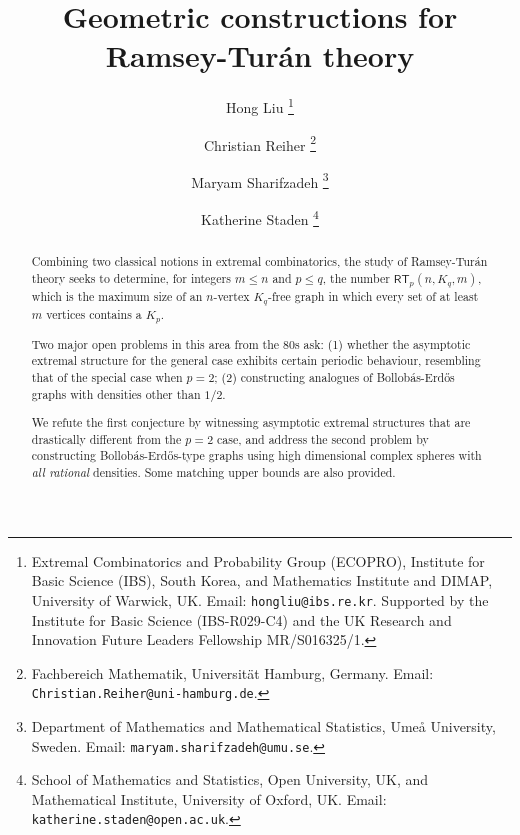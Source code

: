 \documentclass[11pt, a4paper]{article}
\title{Geometric constructions for Ramsey-Tur\'an theory}
\author{
	Hong Liu
	\thanks{Extremal Combinatorics and Probability Group (ECOPRO), Institute for Basic Science (IBS), South Korea, and Mathematics Institute and DIMAP, University of Warwick, UK. Email: \texttt{hongliu@ibs.re.kr}. Supported by the Institute for Basic Science (IBS-R029-C4) and  the UK Research and Innovation Future Leaders Fellowship MR/S016325/1.}
	\and
	Christian Reiher
	\thanks{Fachbereich Mathematik, Universit\"at Hamburg, Germany. Email: {\tt Christian.Reiher@uni-hamburg.de}.}
	\and
	Maryam Sharifzadeh 
	\thanks{Department of Mathematics and Mathematical Statistics, Ume\r{a} University, Sweden. Email: {\tt maryam.sharifzadeh@umu.se}.}
	\and 
	Katherine Staden
	\thanks{School of Mathematics and Statistics, Open University, UK, and Mathematical Institute, University of Oxford, UK. Email: {\tt katherine.staden@open.ac.uk}.}
}
\theoremstyle{definition}
\newcommand{\rt}{{\mathsf{RT}}}
\begin{document}
	
\maketitle

\begin{abstract}
	Combining two classical notions in extremal combinatorics, the study of Ramsey-Tur\'an theory seeks to determine, for integers $m\le n$ and $p \leq q$, the number $\rt_p(n,K_q,m)$, which is the maximum size of an $n$-vertex $K_q$-free graph in which every set of at least $m$ vertices contains a $K_p$. 
	
	Two major open problems in this area from the 80s ask: (1) whether the asymptotic extremal structure for the general case exhibits certain periodic behaviour, resembling that of the special case when $p=2$; (2) constructing analogues of Bollob\'as-Erd\H{o}s graphs with densities other than $1/2$.
	
	We refute the first conjecture by witnessing asymptotic extremal structures that are drastically different from the $p=2$ case, and address the second problem by constructing Bollob\'as-Erd\H{o}s-type graphs using high dimensional complex spheres with \emph{all rational} densities. Some matching upper bounds are also provided.
\end{abstract}
\end{document}
